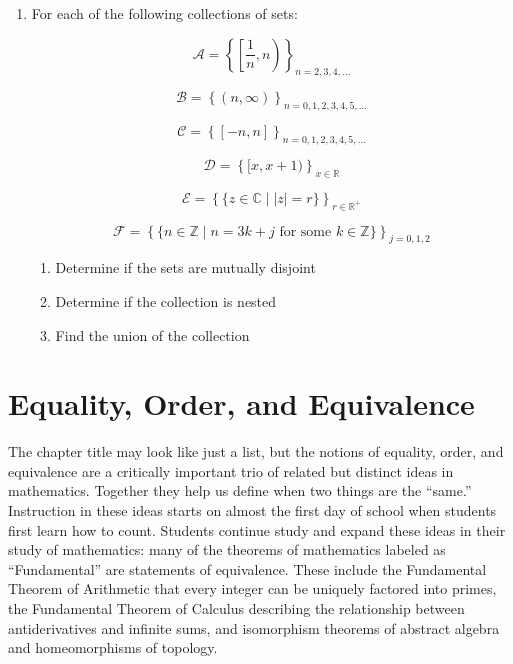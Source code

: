 \documentclass[
]{book}
\providecommand{\tightlist}{%
  \setlength{\itemsep}{0pt}\setlength{\parskip}{0pt}}
\theoremstyle{definition}
\theoremstyle{definition}
\theoremstyle{definition}
\theoremstyle{remark}
\begin{document}
\begin{enumerate}
\def\labelenumi{\arabic{enumi}.}
\item
  For each of the following collections of sets:

  \[\displaystyle{\mathcal{A} = \left\{ \left[ \frac{1}{n},n\right) \right\}_{n=2,3,4,\ldots }}\]

  \[\displaystyle{\mathcal{B} = \left\{ \left( n,\infty \right) \right\}_{n=0,1,2,3,4,5,\ldots} }\]

  \[\displaystyle{\mathcal{C} = \left\{ \left[ -n, n \right] \right\}_{n=0,1,2,3,4,5,\ldots }}\]

  \[\displaystyle{\mathcal{D} = \left\{ [x,x+1)\right\}_{x\in \mathbb{R}}}\]

  \[\displaystyle{\mathcal{E} = \left\{ \{z\in \mathbb{C}\middle \vert|z|=r\}\right\}_{r\in \mathbb{R}^+} }\]

  \[\displaystyle{\mathcal{F} = \left\{ \{n\in \mathbb{Z}\middle \vert n=3k+j \mbox{ for some } k\in \mathbb{Z}\}\right\}_{j=0,1,2}}\]

  \begin{enumerate}
  \def\labelenumii{\alph{enumii}.}
  \tightlist
  \item
    Determine if the sets are mutually disjoint
  \item
    Determine if the collection is nested
  \item
    Find the union of the collection
  \end{enumerate}
\end{enumerate}

\hypertarget{ch:equivalence}{%
\chapter{Equality, Order, and Equivalence}\label{ch:equivalence}}

The chapter title may look like just a list, but the notions of equality, order, and equivalence are a critically important trio of related but distinct ideas in mathematics. Together they help us define when two things are the ``same.'' Instruction in these ideas starts on almost the first day of school when students first learn how to count. Students continue study and expand these ideas in their study of mathematics: many of the theorems of mathematics labeled as ``Fundamental'' are statements of equivalence. These include the Fundamental Theorem of Arithmetic that every integer can be uniquely factored into primes, the Fundamental Theorem of Calculus describing the relationship between antiderivatives and infinite sums, and isomorphism theorems of abstract algebra and homeomorphisms of topology.
\end{document}
